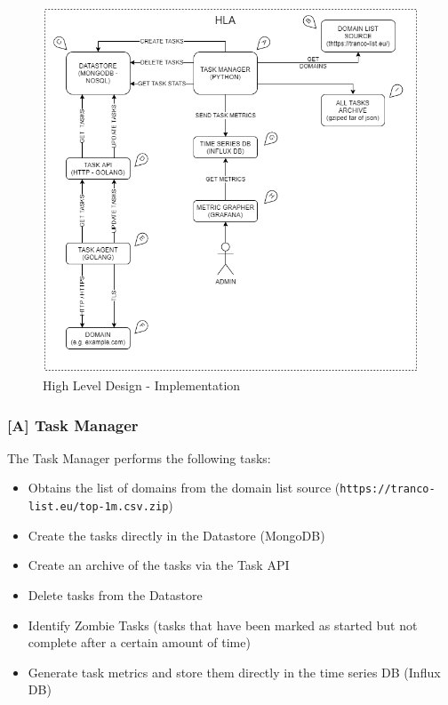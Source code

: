 \documentclass{mscreport}
\begin{document}
\begin{figure}[h!]
	\begin{center}
		\includegraphics[scale=0.65]{../images/HLA_Implementation_v1_Entites.png} 
		\caption{High Level Design - Implementation}
		\label{fig:hla_design_implmementation}
	\end{center}
\end{figure}

\clearpage

\newpage

\subsubsection{[A] Task Manager}

The Task Manager performs the following tasks:

\begin{itemize}
	\setlength\itemsep{0.1em}
    \item Obtains the list of domains from the domain list source \newline (\texttt{https://tranco-list.eu/top-1m.csv.zip})
    \item Create the tasks directly in the Datastore (MongoDB)
    \item Create an archive of the tasks via the Task API
    \item Delete tasks from the Datastore
    \item Identify Zombie Tasks (tasks that have been marked as started but not complete after a certain amount of time)
    \item Generate task metrics and store them directly in the time series DB (Influx DB)
\end{itemize}
\end{document}
